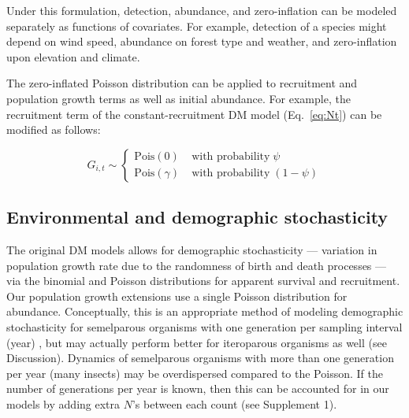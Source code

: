\documentclass[12pt,english]{article}
\begin{document}
\begin{spacing}{1.9}
\begin{flushleft}
Under this formulation, 
detection, abundance, and zero-inflation can be modeled separately as
functions of covariates. For example, detection of a
species might depend on wind speed,
abundance on forest type and weather, and zero-inflation upon elevation and
climate.  

The zero-inflated Poisson distribution can be applied to recruitment and 
population growth terms as well as initial abundance. For example, 
the recruitment term of the constant-recruitment DM model
(Eq.~\ref{eq:Nt}) can be modified as follows:
\begin{linenomath*}
\begin{equation}
G_{i,t} \sim \left\{
\begin{aligned}
\mathrm{Pois}(0) &\; \text{with probability} \; \psi \\
\mathrm{Pois}(\gamma) &\; \text{with probability} \; (1-\psi)\end{aligned} \right.
\label{eq:ZIPts}
\end{equation}
\end{linenomath*}

\subsection*{Environmental and demographic stochasticity}

The original DM models allows for demographic stochasticity --- variation in population growth 
rate due to the randomness of birth and death processes --- 
via the binomial and Poisson distributions for apparent survival and recruitment.  Our population
growth extensions use a single Poisson distribution for abundance. 
Conceptually, this is an appropriate method of modeling demographic stochasticity 
for semelparous organisms with one generation per sampling interval (year)
\citep{bonsall_hastings:2004,melbourne_hastings:2008},
but may actually perform better for iteroparous organisms as well (see Discussion).  
Dynamics of semelparous organisms with more than one generation per year 
(many insects) may be overdispersed compared to the Poisson.  If the number of generations per
year is known, then this can be accounted for in our models by adding extra $N$'s between each
count (see Supplement 1).


\end{flushleft}
\end{spacing}
\end{document}
